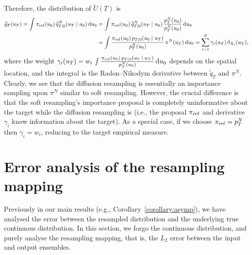 \documentclass{article}
\begin{document}
Therefore, the distribution of $\widetilde{U}(T)$ is 
%
\begin{equation}
    \begin{split}
        \widetilde{q}_T(u_T) = \int \pi_{\mathrm{ref}}(u_0) \, \widetilde{q}^N_{T|0}(u_T {\;|\;} u_0) \mathop{}\!\mathrm{d} u_0 &= \int \pi_{\mathrm{ref}}(u_0) \, \widetilde{q}^N_{T|0}(u_T {\;|\;} u_0) \, \frac{p_T^N(u_0)}{p_T^N(u_0)} \mathop{}\!\mathrm{d} u_0 \\
        &=\int \frac{\pi_{\mathrm{ref}}(u_0) \, p_{T|0}(u_0 {\;|\;} u_T)}{p_T^N(u_0)} \, \pi^N(u_T) \mathop{}\!\mathrm{d} u_0 = \sum_{i=1}^N \gamma_i(u_T) \, \delta_{X_i}(u_T), 
        \label{equ:resampling-dist}
    \end{split}
\end{equation}
%
where the weight $\gamma_i(u_T) = w_i \, \int \frac{\pi_{\mathrm{ref}}(u_0) \, p_{T|0}(u_0 {\;|\;} u_T)}{p_T^N(u_0)} \mathop{}\!\mathrm{d} u_0$ depends on the spatial location, and the integral is the Radon--Nikodym derivative between $\widetilde{q}_T$ and $\pi^N$. 
Clearly, we see that the diffusion resampling is essentially an importance sampling upon $\pi^N$ similar to soft resampling. 
However, the crucial difference is that the soft resampling's importance proposal is completely uninformative about the target while the diffusion resampling is (i.e., the proposal $\pi_{\mathrm{ref}}$ and derivative $\gamma_i$ know information about the target).  
As a special case, if we choose $\pi_{\mathrm{ref}} = p_T^N$ then $\gamma_i = w_i$, reducing to the target empirical measure. 

\section{Error analysis of the resampling mapping}
\label{app:error-resampling-only}
Previously in our main results (e.g., Corollary~\ref{corollary:asymp}), we have analysed the error between the resampled distribution and the underlying true continuous distribution. 
In this section, we forgo the continuous distribution, and purely analyse the resampling mapping, that is, the $L_2$ error between the input and output ensembles. 
\end{document}
